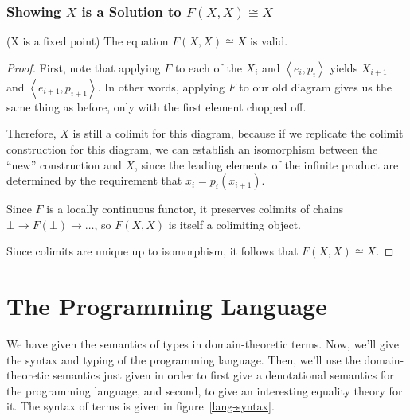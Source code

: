 \subsubsection{Showing $X$ is a Solution to $F(X, X) \cong X$}

\begin{lemma}{(X is a fixed point)} The equation $F(X, X) \cong X$
is valid.
\end{lemma}
\begin{proof}
First, note that applying $F$ to each of the $X_i$ and $\left<e_i,
p_i\right>$ yields $X_{i+1}$ and $\left<e_{i+1}, p_{i+1}\right>$.  In
other words, applying $F$ to our old diagram gives us the same thing
as before, only with the first element chopped off.

Therefore, $X$ is still a colimit for this diagram, because if we
replicate the colimit construction for this diagram, we can establish
an isomorphism between the ``new'' construction and $X$, since the
leading elements of the infinite product are determined by the
requirement that $x_i = p_i(x_{i+1})$.

Since $F$ is a locally continuous functor, it preserves colimits of
chains $\bot \longrightarrow F(\bot) \longrightarrow \ldots$, so $F(X,
X)$ is itself a colimiting object. 

Since colimits are unique up to isomorphism, it follows that $F(X, X)
\cong X$. 

\end{proof}


\section{The Programming Language}

We have given the semantics of types in domain-theoretic terms. Now,
we'll give the syntax and typing of the programming language. Then,
we'll use the domain-theoretic semantics just given in order to first
give a denotational semantics for the programming language, and
second, to give an interesting equality theory for it. The syntax of 
terms is given in figure~\ref{lang-syntax}. 


